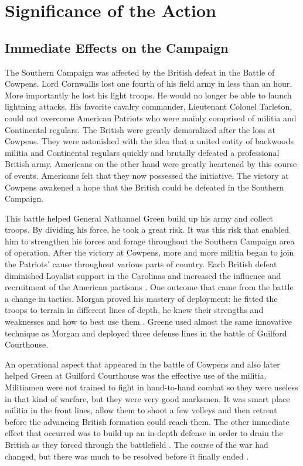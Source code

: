 \section{Significance of the Action}

\subsection{Immediate Effects on the Campaign}

The Southern Campaign was affected by the British defeat in the Battle of
Cowpens. Lord Cornwallis lost one fourth of his field army in less than an hour.
More importantly he lost his light troops. He would no longer be able to launch
lightning attacks. His favorite cavalry commander, Lieutenant Colonel Tarleton,
could not overcome American Patriots who were mainly comprised of militia and
Continental regulars. The British were greatly demoralized after the loss at
Cowpens. They were astonished with the idea that a united entity of backwoods
militia and Continental regulars quickly and brutally defeated a professional
British army. Americans on the other hand were greatly heartened by this course
of events. Americans felt that they now possessed the initiative. The victory at
Cowpens awakened a hope that the British could be defeated in the Southern
Campaign. 

This battle helped General Nathanael Green build up his army and collect troops.
By dividing his force, he took a great risk.  It was this risk that enabled him
to strengthen his forces and forage throughout the Southern Campaign area of
operation.  After the victory at Cowpens, more and more militia began to join
the Patriots’ cause throughout various parts of country.  Each British defeat
diminished Loyalist support in the Carolinas and increased the influence and
recruitment of the American partisans \cite[p.57]{swisher_duel_2002}.  One outcome that
came from the battle a change in tactics. Morgan proved his mastery of
deployment: he fitted the troops to terrain in different lines of depth, he knew
their strengths and weaknesses and how to best use them
\cite[p.326]{stephenson_patriot_2007}.  Greene used almost the same innovative technique as
Morgan and deployed three defense lines in the battle of Guilford Courthouse.

An operational aspect that appeared in the battle of Cowpens and also later
helped Green at Guilford Courthouse was the effective use of the militia.
Militiamen were not trained to fight in hand-to-hand combat so they were useless
in that kind of warfare, but they were very good marksmen. It was smart place
militia in the front lines, allow them to shoot a few volleys and then retreat
before the advancing British formation could reach them. The other immediate
effect that occurred was to build up an in-depth defense in order to drain the
British as they forced through the battlefield
\cite[p.334]{stephenson_patriot_2007}.  The
course of the war had changed, but there was much to be resolved before it
finally ended \cite[p.138]{babits_devil_2001}. 


